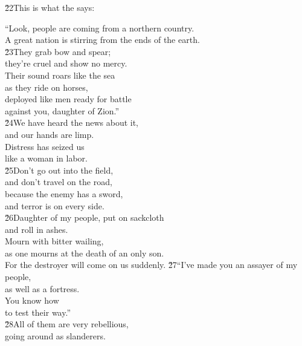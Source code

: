 \begin{poetry}
\poeml \v{22}This is what the  says:
\end{poetry}

\begin{poetry}
\poeml ``Look, people are coming from a northern country. \\
\poemll    A great nation is stirring from the ends of the earth. \\
\poeml \v{23}They grab bow and spear; \\
\poemll    they're cruel and show no mercy. \\
\poeml Their sound roars like the sea \\
\poemll    as they ride on horses, \\
\poeml deployed like men ready for battle \\
\poemll    against you, daughter of Zion.'' \\
\poeml \v{24}We have heard the news about it, \\
\poemll    and our hands are limp. \\
\poeml Distress has seized us \\
\poemll    like a woman in labor. \\
\poeml \v{25}Don't go out into the field, \\
\poemll    and don't travel on the road, \\
\poeml because the enemy has a sword, \\
\poemll    and terror is on every side. \\
\poeml \v{26}Daughter of my people, put on sackcloth \\
\poemll    and roll in ashes. \\
\poeml Mourn with bitter wailing, \\
\poemll    as one mourns at the death of an only son. \\
\poeml For the destroyer will come on us suddenly.
\poeml \v{27}``I've made you an assayer of my people, \\
\poemll    as well as a fortress. \\
\poeml You know how \\
\poemll    to test their way.'' \\
\poeml \v{28}All of them are very rebellious, \\
\poemll    going around as slanderers. \\

\end{poetry}
